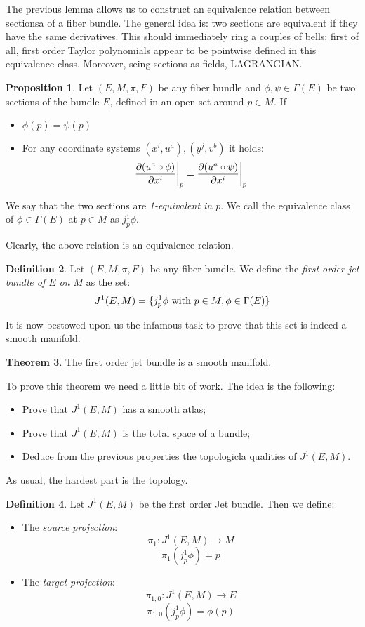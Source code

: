 \documentclass[12pt,a4paper]{report}
\theoremstyle{definition}
\newtheorem{Def}{Definition}[chapter]
\theoremstyle{Theorem}
\newtheorem{Theo}[Def]{Theorem}
\newtheorem{Prop}[Def]{Proposition}
\theoremstyle{definition}
\theoremstyle{definition}
\begin{document}
	The previous lemma allows us to construct an equivalence relation between sectionsa of a fiber bundle. The general idea is: two sections are equivalent if they have the same derivatives. This should immediately ring a couples of bells: first of all, first order Taylor polynomials appear to be pointwise defined in this equivalence class. Moreover, seing sections as fields, LAGRANGIAN.
	\begin{Prop}
		Let $(E,M,\pi,F)$ be any fiber bundle and $\phi,\psi\in\Gamma(E)$ be two sections of the bundle $E$, defined in an open set around $p\in M$. If
		\begin{itemize}
			\item $\phi(p)=\psi(p)$ 
			\item For any coordinate systems $(x^i,u^a),(y^j,v^b)$ it holds:
			$${\partial(u^a\circ\phi) \over \partial{x^i}}\bigg|_p={\partial(u^a\circ\psi) \over \partial{x^i}}\bigg|_p$$
		\end{itemize} 
		We say that the two sections are \textit{1-equivalent in $p$}. We call the equivalence class of $\phi\in\Gamma(E)$ at $p\in M$ as $j_p^1\phi$.
	\end{Prop}
	Clearly, the above relation is an equivalence relation.
	\begin{Def}
		Let $(E,M,\pi,F)$ be any fiber bundle. We define the \textit{first order jet bundle of $E$ on $M$} as the set:
		$$J^1(E,M)=\{j^1_p\phi \hbox{ with }p\in M, \phi\in\Gamma(E)\}$$
	\end{Def}
	It is now bestowed upon us the infamous task to prove that this set is indeed a smooth manifold.
	\begin{Theo}
		The first order jet bundle is a smooth manifold.
	\end{Theo}
	To prove this theorem we need a little bit of work. The idea is the following:
	\begin{itemize}
		\item Prove that $J^1(E,M)$ has a smooth atlas;
		\item Prove that $J^1(E,M)$ is the total space of a bundle;
		\item Deduce from the previous properties the topologicla qualities of $J^1(E,M)$. 
	\end{itemize}
	As usual, the hardest part is the topology.
	\begin{Def}
		Let $J^1(E,M)$ be the first order Jet bundle. Then we define:
		\begin{itemize}
			\item The \textit{source projection}:
			$$
				\pi_{1}:J^1(E,M)\longrightarrow M $$
				$$
				\pi_1(j^1_p\phi)=p$$	
			\item The \textit{target projection}:
			$$
			\pi_{1,0}:J^1(E,M)\longrightarrow E $$
			$$
			\pi_{1,0}(j^1_p\phi)=\phi(p)$$		
		\end{itemize}
	\end{Def}
\end{document}
